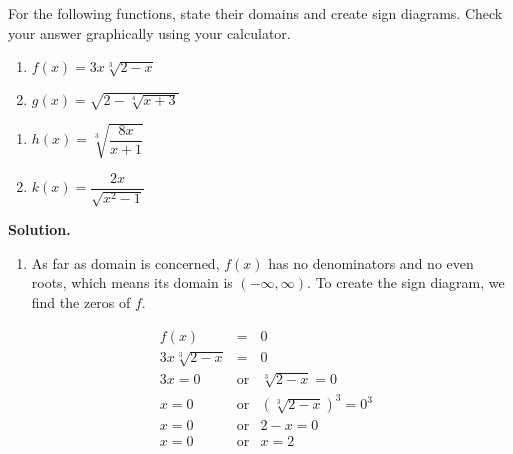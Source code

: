 \documentclass[12pt]{ximera}
\begin{document}
\begin{example}  For the following functions, state their domains and create sign diagrams.  Check your answer graphically using your calculator. 

\begin{multicols}{2}
\begin{enumerate}

\item  $f(x) = 3x \sqrt[3]{2-x}$

\item  $g(x) = \sqrt{2-\sqrt[4]{x+3}}$

\setcounter{HW}{\value{enumi}}
\end{enumerate}
\end{multicols}

\begin{multicols}{2}
\begin{enumerate}
\setcounter{enumi}{\value{HW}}

\item  $h(x) = \sqrt[3]{\dfrac{8x}{x+1}}$

\item  $k(x) = \dfrac{2x}{\sqrt{x^2 - 1}}$

\setcounter{HW}{\value{enumi}}
\end{enumerate}
\end{multicols}


{\bf Solution.}

\begin{enumerate}

\item  As far as domain is concerned, $f(x)$ has no denominators and no even roots, which means its domain is $(-\infty, \infty)$.  To create the sign diagram, we find the zeros of $f$.  

\[ \begin{array}{rclr}

f(x) & = & 0 & \\

3x \sqrt[3]{2-x} & = & 0 \\

3x = 0 & \mbox{or} & \sqrt[3]{2-x} = 0 & \\

x = 0 & \mbox{or} & \left(\sqrt[3]{2-x}\right)^3 = 0^3 & \\

x = 0 & \mbox{or} & 2-x = 0 & \\

x = 0 & \mbox{or} & x=2 & \\


\end{array}\]
\end{enumerate}
\end{example}
\end{document}
